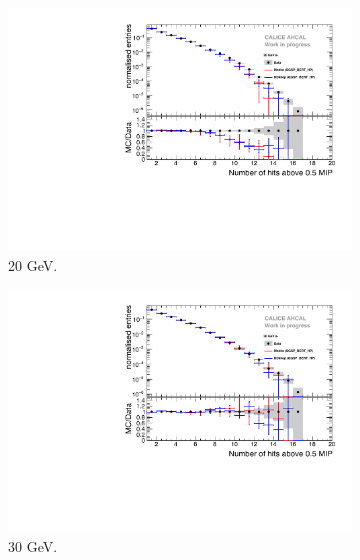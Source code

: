 \begin{figure}[htbp!]
\begin{subfigure}[t]{0.45\textwidth}
		\includegraphics[width=1\textwidth]{chap5/fig_AHCAL_timing/Electrons/Comparison_SimData_Electrons_nHits_20GeV.pdf}
		\caption{20 GeV.}\label{fig:elec_sim_data_nHits_20GeV}
	\end{subfigure}
	\hfill
	\begin{subfigure}[t]{0.45\textwidth}
		\centering
		\includegraphics[width=1\textwidth]{chap5/fig_AHCAL_timing/Electrons/Comparison_SimData_Electrons_nHits_30GeV.pdf}
		\caption{30 GeV.}\label{fig:elec_sim_data_nHits_30GeV}
	\end{subfigure}
	\hfill
	\begin{subfigure}[t]{0.45\textwidth}
		\centering

\end{subfigure}
\end{figure}

